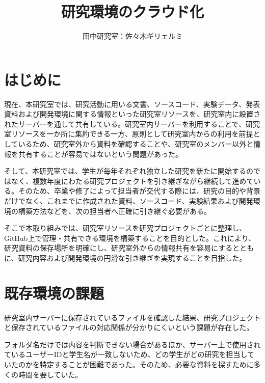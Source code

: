 \documentclass[
  10pt,       %
  twocolumn   %
]{jlreq}      %
\title{
  研究環境のクラウド化 \\
}
\author{
 田中研究室：佐々木ギリェルミ
}
\date{
}
\begin{document}
\maketitle  %

\section{はじめに}\label{sec:Section}  %
現在、本研究室では、研究活動に用いる文書、ソースコード、実験データ、発表資料および開発環境に関する情報といった研究室リソースを、研究室内に設置されたサーバーを通して共有している。研究室内サーバーを利用することで、研究室リソースを一か所に集約できる一方、原則として研究室内からの利用を前提としているため、研究室外から資料を確認することや、研究室のメンバー以外と情報を共有することが容易ではないという問題があった。

そして、本研究室では、学生が毎年それぞれ独立した研究を新たに開始するのではなく、複数年度にわたる研究プロジェクトを引き継ぎながら継続して進めている。そのため、卒業や修了によって担当者が交代する際には、研究の目的や背景だけでなく、これまでに作成された資料、ソースコード、実験結果および開発環境の構築方法などを、次の担当者へ正確に引き継ぐ必要がある。

そこで本取り組みでは、研究室リソースを研究プロジェクトごとに整理し、GitHub上で管理・共有できる環境を構築することを目的とした。これにより、研究資料の保存場所を明確にし、研究室外からの情報共有を容易にするとともに、研究内容および開発環境の円滑な引き継ぎを実現することを目指した。

\section{既存環境の課題}\label{sec:Section}  %
研究室内サーバーに保存されているファイルを確認した結果、研究プロジェクトと保存されているファイルの対応関係が分かりにくいという課題が存在した。

フォルダ名だけでは内容を判断できない場合があるほか、サーバー上で使用されているユーザーIDと学生名が一致しないため、どの学生がどの研究を担当していたのかを特定することが困難であった。そのため、必要な資料を探すために多くの時間を要していた。
\end{document}

